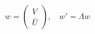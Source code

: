 \begin{equation}
w = \left(
\begin{array}{c}
V\\
\bar{U}
\end{array}
\right),~~~~w' = \Lambda w
\end{equation}

